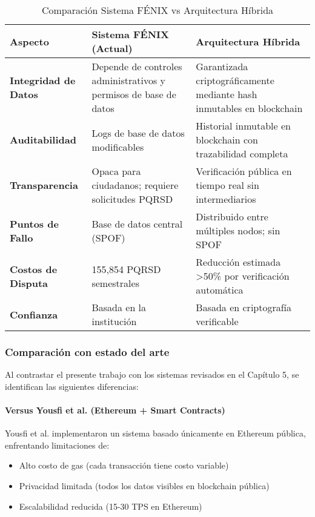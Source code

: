 \begin{table}[h]
\centering
\small
\begin{tabular}{|p{4cm}|p{5cm}|p{5cm}|}
\hline
\textbf{Aspecto} & \textbf{Sistema FÉNIX (Actual)} & \textbf{Arquitectura Híbrida} \\ \hline
\textbf{Integridad de Datos} & Depende de controles administrativos y permisos de base de datos & Garantizada criptográficamente mediante hash inmutables en blockchain \\ \hline
\textbf{Auditabilidad} & Logs de base de datos modificables & Historial inmutable en blockchain con trazabilidad completa \\ \hline
\textbf{Transparencia} & Opaca para ciudadanos; requiere solicitudes PQRSD & Verificación pública en tiempo real sin intermediarios \\ \hline
\textbf{Puntos de Fallo} & Base de datos central (SPOF) & Distribuido entre múltiples nodos; sin SPOF \\ \hline
\textbf{Costos de Disputa} & 155,854 PQRSD semestrales & Reducción estimada >50\% por verificación automática \\ \hline
\textbf{Confianza} & Basada en la institución & Basada en criptografía verificable \\ \hline
\end{tabular}
\caption{Comparación Sistema FÉNIX vs Arquitectura Híbrida}
\label{tab:comparacion_fenix}
\end{table}

\subsubsection{Comparación con estado del arte}

Al contrastar el presente trabajo con los sistemas revisados en el Capítulo 5, se identifican las siguientes diferencias:

\paragraph{Versus Yousfi et al. (Ethereum + Smart Contracts)}
Yousfi et al. implementaron un sistema basado únicamente en Ethereum pública, enfrentando limitaciones de:
\begin{itemize}
    \item Alto costo de gas (cada transacción tiene costo variable)
    \item Privacidad limitada (todos los datos visibles en blockchain pública)
    \item Escalabilidad reducida (15-30 TPS en Ethereum)
\end{itemize}

